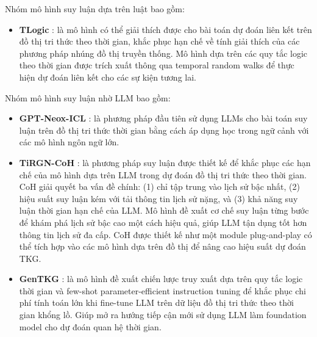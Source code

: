 Nhóm mô hình suy luận dựa trên luật bao gồm:
\begin{itemize}
    \item \textbf{TLogic} \cite{ref_article23}: là mô hình có thể giải thích được cho bài toán dự đoán liên kết trên đồ thị tri thức theo thời gian, khắc phục hạn chế về tính giải thích của các phương pháp nhúng đồ thị truyền thống. Mô hình dựa trên các quy tắc logic theo thời gian được trích xuất thông qua temporal random walks để thực hiện dự đoán liên kết cho các sự kiện tương lai.
\end{itemize}

Nhóm mô hình suy luận nhờ LLM bao gồm:
\begin{itemize}
    \item \textbf{GPT-Neox-ICL} \cite{ref_article08}: là phương pháp đầu tiên sử dụng LLMs cho bài toán suy luận trên đồ thị tri thức thời gian bằng cách áp dụng học trong ngữ cảnh với các mô hình ngôn ngữ lớn.
    \item \textbf{TiRGN-CoH} \cite{ref_article09}: là phương pháp suy luận được thiết kế để khắc phục các hạn chế của mô hình dựa trên LLM trong dự đoán đồ thị tri thức theo thời gian. CoH giải quyết ba vấn đề chính: (1) chỉ tập trung vào lịch sử bậc nhất, (2) hiệu suất suy luận kém với tải thông tin lịch sử nặng, và (3) khả năng suy luận thời gian hạn chế của LLM. Mô hình đề xuất cơ chế suy luận từng bước để khám phá lịch sử bậc cao một cách hiệu quả, giúp LLM tận dụng tốt hơn thông tin lịch sử đa cấp. CoH được thiết kế như một module plug-and-play có thể tích hợp vào các mô hình dựa trên đồ thị để nâng cao hiệu suất dự đoán TKG.
    \item \textbf{GenTKG} \cite{ref_article10}: là mô hình đề xuất chiến lược truy xuất dựa trên quy tắc logic thời gian và few-shot parameter-efficient instruction tuning để khắc phục chi phí tính toán lớn khi fine-tune LLM trên dữ liệu đồ thị tri thức theo thời gian khổng lồ. Giúp mở ra hướng tiếp cận mới sử dụng LLM làm foundation model cho dự đoán quan hệ thời gian.
\end{itemize}

